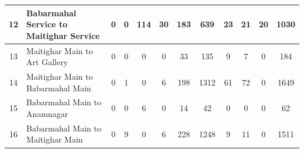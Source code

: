 \begin{landscape}
\begin{table}[h]
\begin{tabular}{|c|p{6cm}|c|c|c|c|c|c|c|c|c|c|}
\hline
12 & Babarmahal Service to Maitighar Service & 0 & 0 & 114 & 30 & 183 & 639 & 23 & 21 & 20 & 1030 \\
\hline
13 & Maitighar Main to Art Gallery & 0 & 0 & 0 & 0 & 33 & 135 & 9 & 7 & 0 & 184 \\
\hline
14 & Maitighar Main to Babarmahal Main & 0 & 1 & 0 & 6 & 198 & 1312 & 61 & 72 & 0 & 1649 \\
\hline
15 & Babarmahal Main to Anamnagar & 0 & 0 & 6 & 0 & 14 & 42 & 0 & 0 & 0 & 62 \\
\hline
16 & Babarmahal Main to Maitighar Main & 0 & 9 & 0 & 6 & 228 & 1248 & 9 & 11 & 0 & 1511 \\
\hline

\end{tabular}
\end{table}
\end{landscape}

